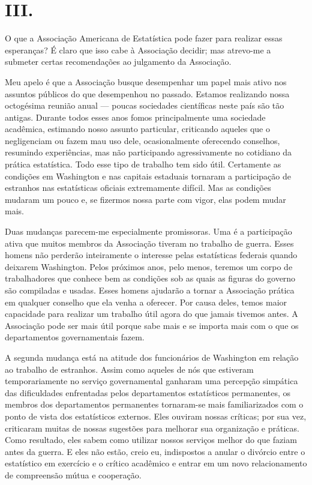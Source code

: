 \documentclass[12pt]{article}
\begin{document}
\section*{III.}

O que a Associação Americana de Estatística pode fazer para realizar essas esperanças? É claro que isso cabe à Associação decidir; mas atrevo-me a submeter certas recomendações ao julgamento da Associação.

Meu apelo é que a Associação busque desempenhar um papel mais ativo nos assuntos públicos do que desempenhou no passado. Estamos realizando nossa octogésima reunião anual — poucas sociedades científicas neste país são tão antigas. Durante todos esses anos fomos principalmente uma sociedade acadêmica, estimando nosso assunto particular, criticando aqueles que o negligenciam ou fazem mau uso dele, ocasionalmente oferecendo conselhos, resumindo experiências, mas não participando agressivamente no cotidiano da prática estatística. Todo esse tipo de trabalho tem sido útil. Certamente as condições em Washington e nas capitais estaduais tornaram a participação de estranhos nas estatísticas oficiais extremamente difícil. Mas as condições mudaram um pouco e, se fizermos nossa parte com vigor, elas podem mudar mais.

Duas mudanças parecem-me especialmente promissoras. Uma é a participação ativa que muitos membros da Associação tiveram no trabalho de guerra. Esses homens não perderão inteiramente o interesse pelas estatísticas federais quando deixarem Washington. Pelos próximos anos, pelo menos, teremos um corpo de trabalhadores que conhece bem as condições sob as quais as figuras do governo são compiladas e usadas. Esses homens ajudarão a tornar a Associação prática em qualquer conselho que ela venha a oferecer. Por causa deles, temos maior capacidade para realizar um trabalho útil agora do que jamais tivemos antes. A Associação pode ser mais útil porque sabe mais e se importa mais com o que os departamentos governamentais fazem.

A segunda mudança está na atitude dos funcionários de Washington em relação ao trabalho de estranhos. Assim como aqueles de nós que estiveram temporariamente no serviço governamental ganharam uma percepção simpática das dificuldades enfrentadas pelos departamentos estatísticos permanentes, os membros dos departamentos permanentes tornaram-se mais familiarizados com o ponto de vista dos estatísticos externos. Eles ouviram nossas críticas; por sua vez, criticaram muitas de nossas sugestões para melhorar sua organização e práticas. Como resultado, eles sabem como utilizar nossos serviços melhor do que faziam antes da guerra. E eles não estão, creio eu, indispostos a anular o divórcio entre o estatístico em exercício e o crítico acadêmico e entrar em um novo relacionamento de compreensão mútua e cooperação.
\end{document}
